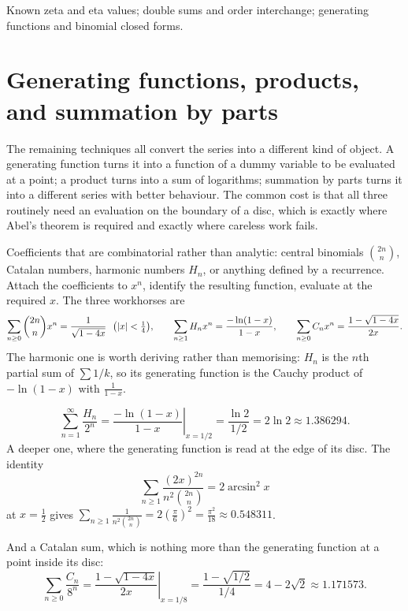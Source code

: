 \begin{seealsob}Known zeta and eta values; double sums and order interchange; generating functions and binomial closed forms.\end{seealsob}

\section{Generating functions, products, and summation by parts}

The remaining techniques all convert the series into a different kind of object. A generating function turns it into a function of a dummy variable to be evaluated at a point; a product turns into a sum of logarithms; summation by parts turns it into a different series with better behaviour. The common cost is that all three routinely need an evaluation on the boundary of a disc, which is exactly where Abel's theorem is required and exactly where careless work fails.

\cue Coefficients that are combinatorial rather than analytic: central binomials $\binom{2n}{n}$, Catalan numbers, harmonic numbers $H_n$, or anything defined by a recurrence.
\method Attach the coefficients to $x^{n}$, identify the resulting function, evaluate at the required $x$. The three workhorses are
\[\sum_{n\geq0}\binom{2n}{n}x^{n}=\frac{1}{\sqrt{1-4x}}\ \ \bigl(\abs{x}<\tfrac14\bigr),\qquad \sum_{n\geq1}H_nx^{n}=\frac{-\ln(1-x)}{1-x},\qquad \sum_{n\geq0}C_nx^{n}=\frac{1-\sqrt{1-4x}}{2x}.\]
The harmonic one is worth deriving rather than memorising: $H_n$ is the $n$th partial sum of $\sum1/k$, so its generating function is the Cauchy product of $-\ln(1-x)$ with $\tfrac{1}{1-x}$.

\begin{worked}
\[\sum_{n=1}^{\infty}\frac{H_n}{2^{n}}=\left.\frac{-\ln(1-x)}{1-x}\right|_{x=1/2}=\frac{\ln2}{1/2}=2\ln2\approx1.386294.\]
A deeper one, where the generating function is read at the edge of its disc. The identity
\[\sum_{n\geq1}\frac{(2x)^{2n}}{n^{2}\binom{2n}{n}}=2\arcsin^{2}x\]
at $x=\tfrac12$ gives $\displaystyle\sum_{n\geq1}\frac{1}{n^{2}\binom{2n}{n}}=2\left(\frac{\pi}{6}\right)^{2}=\frac{\pi^{2}}{18}\approx0.548311$.
\end{worked}
And a Catalan sum, which is nothing more than the generating function at a point inside its disc:
\[\sum_{n\geq0}\frac{C_n}{8^{n}}=\left.\frac{1-\sqrt{1-4x}}{2x}\right|_{x=1/8}=\frac{1-\sqrt{1/2}}{1/4}=4-2\sqrt2\approx1.171573.\]

